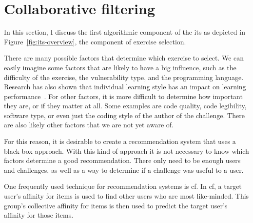 \section{Collaborative filtering}
\label{sec:collab}

In this section, I discuss the first algorithmic component of the \gls{its} as depicted in Figure~\ref{fig:its-overview}, the component of exercise selection.

There are many possible factors that determine which exercise to select.
We can easily imagine some factors that are likely to have a big influence, such as the difficulty of the exercise, the vulnerability type, and the programming language.
Research has also shown that individual learning style has an impact on learning performance~\cite{alshammari2015design,schiaffino2008eteacher,graf2006representative,felder1988learning}.
For other factors, it is more difficult to determine how important they are, or if they matter at all.
Some examples are code quality, code legibility, software type, or even just the coding style of the author of the challenge.
There are also likely other factors that we are not yet aware of.

For this reason, it is desirable to create a recommendation system that uses a black box approach.
With this kind of approach it is not necessary to know which factors determine a good recommendation.
There only need to be enough users and challenges, as well as a way to determine if a challenge was useful to a user.

One frequently used technique for recommendation systems is \gls{cf}.
In \gls{cf}, a target user's affinity for items is used to find other users who are most like-minded.
This group's collective affinity for items is then used to predict the target user's affinity for those items.

